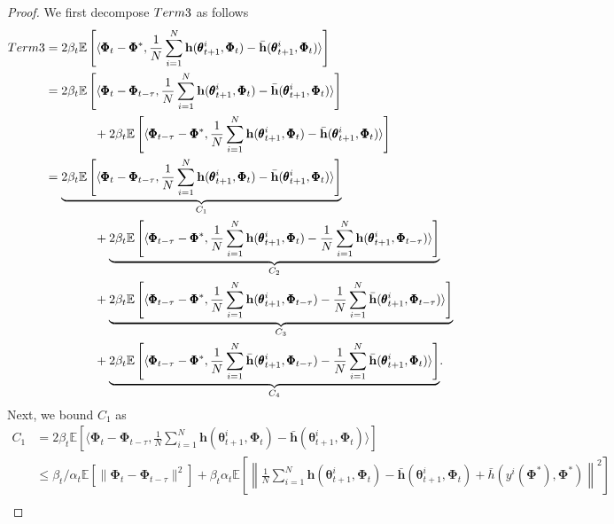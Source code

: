 \documentclass[10pt,a4paper]{amsart}
\def\bh{\mathbf{h}}
\begin{document}
\begin{proof}
We first decompose $\textnormal{Term 3}$ as follows
\begin{align*}
    \textnormal{Term 3}&=2\beta_t\mathbb{E}\left[\langle\pmb{\Phi}_t-\pmb{\Phi}^*, \frac{1}{N}\sum_{i=1}^N\bh(\pmb{\theta}_{t+1}^i, \pmb{\Phi}_t)-\bar{\bh}(\pmb{\theta}_{t+1}^i, \pmb{\Phi}_t)\rangle\right]\allowdisplaybreaks\\
&=2\beta_t\mathbb{E}\left[\langle\pmb{\Phi}_t-\pmb{\Phi}_{t-\tau}, \frac{1}{N}\sum_{i=1}^N\bh(\pmb{\theta}_{t+1}^i, \pmb{\Phi}_t)-\bar{\bh}(\pmb{\theta}_{t+1}^i, \pmb{\Phi}_t)\rangle\right]\allowdisplaybreaks\\
&\qquad\qquad+2\beta_t\mathbb{E}\left[\langle\pmb{\Phi}_{t-\tau}-\pmb{\Phi}^*, \frac{1}{N}\sum_{i=1}^N\bh(\pmb{\theta}_{t+1}^i, \pmb{\Phi}_t)-\bar{\bh}(\pmb{\theta}_{t+1}^i, \pmb{\Phi}_t)\rangle\right]\allowdisplaybreaks\\
    &=\underset{C_1}{\underbrace{2\beta_t\mathbb{E}\left[\langle\pmb{\Phi}_t-\pmb{\Phi}_{t-\tau}, \frac{1}{N}\sum_{i=1}^N\bh(\pmb{\theta}_{t+1}^i, \pmb{\Phi}_t)-\bar{\bh}(\pmb{\theta}_{t+1}^i, \pmb{\Phi}_t)\rangle\right]}}\allowdisplaybreaks\\
    &\qquad\qquad+\underset{C_2}{\underbrace{2\beta_t\mathbb{E}\left[\langle\pmb{\Phi}_{t-\tau}-\pmb{\Phi}^*, \frac{1}{N}\sum_{i=1}^N\bh(\pmb{\theta}_{t+1}^i, \pmb{\Phi}_t)- \frac{1}{N}\sum_{i=1}^N\bh(\pmb{\theta}_{t+1}^i, \pmb{\Phi}_{t-\tau})\rangle\right]}}\allowdisplaybreaks\\
    &\qquad\qquad+\underset{C_3}{\underbrace{2\beta_t\mathbb{E}\left[\langle\pmb{\Phi}_{t-\tau}-\pmb{\Phi}^*, \frac{1}{N}\sum_{i=1}^N\bh(\pmb{\theta}_{t+1}^i, \pmb{\Phi}_{t-\tau})- \frac{1}{N}\sum_{i=1}^N\bar{\bh}(\pmb{\theta}_{t+1}^i, \pmb{\Phi}_{t-\tau})\rangle\right]}}\allowdisplaybreaks\\
    &\qquad\qquad+\underset{C_4}{\underbrace{2\beta_t\mathbb{E}\left[\langle\pmb{\Phi}_{t-\tau}-\pmb{\Phi}^*, \frac{1}{N}\sum_{i=1}^N\bar{\bh}(\pmb{\theta}_{t+1}^i, \pmb{\Phi}_{t-\tau})- \frac{1}{N}\sum_{i=1}^N\bar{\bh}(\pmb{\theta}_{t+1}^i, \pmb{\Phi}_{t})\rangle\right]}}.
\end{align*}
Next, we bound $C_1$ as
\begin{align*}
    C_1&=2\beta_t\mathbb{E}\left[\langle\pmb{\Phi}_t-\pmb{\Phi}_{t-\tau}, \frac{1}{N}\sum_{i=1}^N\bh(\pmb{\theta}_{t+1}^i, \pmb{\Phi}_t)-\bar{\bh}(\pmb{\theta}_{t+1}^i, \pmb{\Phi}_t)\rangle\right]\\
    &\leq  \beta_t/\alpha_t\mathbb{E}[\|\pmb{\Phi}_t-\pmb{\Phi}_{t-\tau}\|^2] + \beta_t\alpha_t\mathbb{E}\left[\left\|\frac{1}{N}\sum_{i=1}^N \bh(\pmb{\theta}_{t+1}^i, \pmb{\Phi}_t)-\bar{\bh}(\pmb{\theta}_{t+1}^i, \pmb{\Phi}_t)+\bar{h}(y^i(\pmb{\Phi}^{*}), \pmb{\Phi}^*)\right\|^2\right]\\

\end{align*}
\end{proof}
\end{document}
